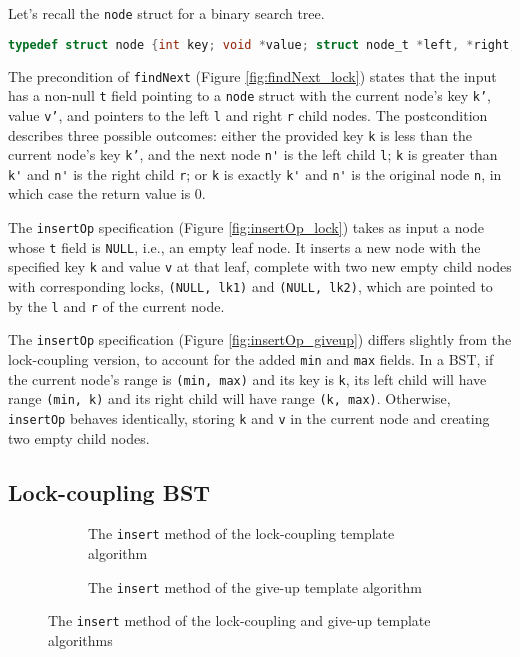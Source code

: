 \documentclass[a4paper,UKenglish,cleveref, autoref, thm-restate]{lipics-v2021}
\newcommand{\wm}[1]{\textbf{\textcolor{violet}{[William: #1]}}}
\begin{document}
Let's recall the \texttt{node} struct for a binary search tree. 
\begin{lstlisting}[language = C, backgroundcolor=\color{white}, basicstyle=\ttfamily\footnotesize]
	typedef struct node {int key; void *value; struct node_t *left, *right;} node;
\end{lstlisting}
The precondition of \texttt{findNext} (Figure \ref*{fig:findNext_lock}) states that the input has a non-null \texttt{t} field pointing to a \texttt{node} struct with the current node's key \texttt{k'}, value \texttt{v'}, and pointers to the left \texttt{l} and right \texttt{r} child nodes. The postcondition describes three possible outcomes: either the provided key \texttt{k} is less than the current node's key \texttt{k'}, and the next node \lstinline{n'} is the left child \lstinline{l}; \lstinline{k} is greater than \lstinline{k'} and \lstinline{n'} is the right child \lstinline{r}; or \lstinline{k} is exactly \lstinline{k'} and \lstinline{n'} is the original node \lstinline{n}, in which case the return value is 0.

The \texttt{insertOp} specification (Figure \ref{fig:insertOp_lock}) takes as input a node whose \lstinline{t} field is \lstinline{NULL}, i.e., an empty leaf node. It inserts a new node with the specified key \texttt{k} and value \texttt{v} at that leaf, complete with two new empty child nodes with corresponding locks, \texttt{(NULL, lk1)} and \texttt{(NULL, lk2)}, which are pointed to by the \texttt{l} and \texttt{r} of the current node.  

The \texttt{insertOp} specification (Figure \ref{fig:insertOp_giveup}) differs slightly from the lock-coupling version, to account for the added \lstinline{min} and \lstinline{max} fields. In a BST, if the current node's range is \lstinline{(min, max)} and its key is \lstinline{k}, its left child will have range \texttt{(min, k)} and its right child will have range \texttt{(k, max)}. Otherwise, \lstinline{insertOp} behaves identically, storing \lstinline{k} and \lstinline{v} in the current node and creating two empty child nodes.


\subsection{Lock-coupling BST}
\label{BST_lock_insert}
\begin{figure}[h]
	\begin{subfigure}[t]{0.48\textwidth}
	 
	\caption{The \lstinline{insert} method of the lock-coupling template algorithm}
	\label{insert_lock}	
	\end{subfigure}\qquad
    \begin{subfigure}[t]{0.48\textwidth}
     
    \caption{The \lstinline{insert} method of the give-up template algorithm}
    \label{insert_giveup}
    \end{subfigure} 
\caption{The \lstinline{insert} method of the lock-coupling and give-up template algorithms}
\label{insert_lock_giveup} 
\end{figure}
\end{document}

